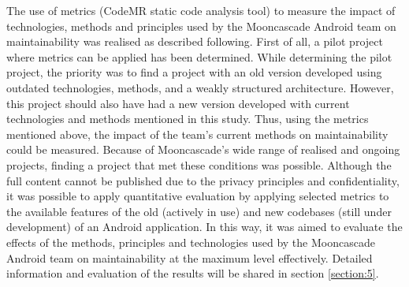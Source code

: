 The use of metrics (CodeMR static code analysis tool) to measure the impact of technologies, methods and principles used by the Mooncascade Android team on maintainability was realised as described following. First of all, a pilot project where metrics can be applied has been determined. While determining the pilot project, the priority was to find a project with an old version developed using outdated technologies, methods, and a weakly structured architecture. However, this project should also have had a new version developed with current technologies and methods mentioned in this study. Thus, using the metrics mentioned above, the impact of the team's current methods on maintainability could be measured. Because of Mooncascade's wide range of realised and ongoing projects, finding a project that met these conditions was possible. Although the full content cannot be published due to the privacy principles and confidentiality, it was possible to apply quantitative evaluation by applying selected metrics to the available features of the old (actively in use) and new codebases (still under development) of an Android application. In this way, it was aimed to evaluate the effects of the methods, principles and technologies used by the Mooncascade Android team on maintainability at the maximum level effectively. Detailed information and evaluation of the results will be shared in section \ref{section:5}.